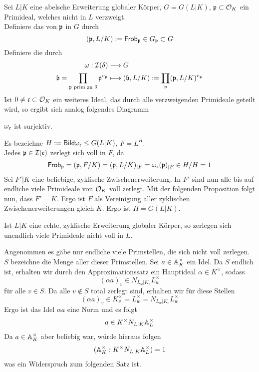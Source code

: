 Sei $L|K$ eine abelsche Erweiterung globaler Körper, $G = G(L|K)$, $\mathfrak{p} \subset \mathcal{O}_K$ ein Primideal, welches nicht in $L$ verzweigt.\\
Definiere das  von $\mathfrak{p}$ in $G$ durch
\[ (\mathfrak{p}, L/K) := \textsf{Frob}_{\mathfrak{p}} \in G_{\mathfrak{p}} \subset G \]
Definiere die  durch
\begin{align*}
\omega : \mathcal{I}(\delta) & \overset{}{\longrightarrow} G\\
\mathfrak{b} = \prod_{\mathfrak{p} \text{ prim zu }\delta} \mathfrak{p}^{v_{\mathfrak{p}}} & \longmapsto (\mathfrak{b},L/K) := \prod_{\mathfrak{p}} (\mathfrak{p}, L/K)^{v_{\mathfrak{p}}}
\end{align*}
Ist $0\neq \mathfrak{c} \subset \mathcal{O}_K$ ein weiteres Ideal, das durch alle verzweigenden Primideale geteilt wird, so ergibt sich analog folgendes Diagramm
\begin{center}
\end{center}

\Satz{}
$\omega_{\mathfrak{c}}$ ist surjektiv.
\begin{Beweis}{}
Es bezeichne $H := \textsf{Bild} \omega_{\mathfrak{c}} \leq G(L|K)$, $F = L^H$.\\
Jedes $\mathfrak{p} \in \mathcal{I}(\mathfrak{c})$ zerlegt sich voll in $F$, da
\[ \textsf{Frob}_{\mathfrak{p}} =  (\mathfrak{p}, F/K) =(\mathfrak{p}, L/K)_{|F} = \omega_{\mathfrak{c}}(\mathfrak{p})_{|F} \in H/H = 1 \]
Sei $F'|K$ eine beliebige, zyklische Zwischenerweiterung. In $F'$ sind nun alle bis auf endliche viele Primideale von $\mathcal{O}_K$ voll zerlegt. Mit der folgenden Proposition folgt nun, dass $F' = K$. Ergo ist $F$ als Vereinigung aller zyklischen Zwischenerweiterungen gleich $K$. Ergo ist $H = G(L|K)$.
\end{Beweis}

\Prop{}
Ist $L|K$ eine echte, zyklische Erweiterung globaler Körper, so zerlegen sich unendlich viele Primideale nicht voll in $L$.

\begin{Beweis}{}
Angenommen es gäbe nur endliche viele Primstellen, die sich nicht voll zerlegen. $S$ bezeichne die Menge aller dieser Primstellen. Sei $a \in \mathbb{A}_K^\times$ ein Idel. Da $S$ endlich ist, erhalten wir durch den Approximationssatz ein Hauptideal $\alpha \in K^\times$, sodass
\[ (\alpha a)_v \in N_{L_w|K_v}L_w^\times\]
für alle $v \in S$. Da alle $v\notin S$ total zerlegt sind, erhalten wir für diese Stellen
\[ (\alpha a)_v \in K_v^\times = L_w^\times = N_{L_w|K_v}L_w^\times \]
Ergo ist das Idel $\alpha a$ eine Norm und es folgt
\[ a \in K^\times N_{L|K}\mathbb{A}_L^\times \]
Da $a \in \mathbb{A}_K^\times$ aber beliebig war, würde hieraus folgen
\[ (\mathbb{A}_K^\times :K^\times N_{L|K} \mathbb{A}_L^\times  ) = 1\]
was ein Widerspruch zum folgenden Satz ist.  
\end{Beweis}

